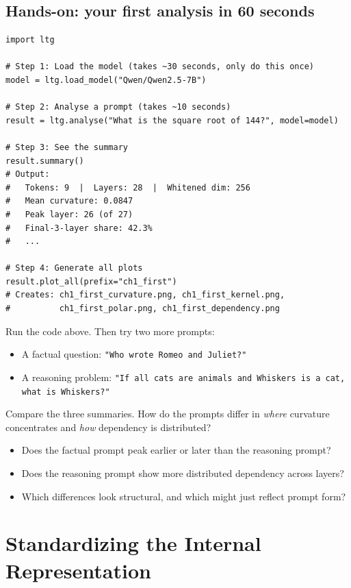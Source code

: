 \documentclass[11pt, twoside, openright]{memoir}
\begin{document}
\section{Hands-on: your first analysis in 60 seconds}

\begin{lstlisting}[caption={Complete first analysis using the ltg library}]
import ltg

# Step 1: Load the model (takes ~30 seconds, only do this once)
model = ltg.load_model("Qwen/Qwen2.5-7B")

# Step 2: Analyse a prompt (takes ~10 seconds)
result = ltg.analyse("What is the square root of 144?", model=model)

# Step 3: See the summary
result.summary()
# Output:
#   Tokens: 9  |  Layers: 28  |  Whitened dim: 256
#   Mean curvature: 0.0847
#   Peak layer: 26 (of 27)
#   Final-3-layer share: 42.3%
#   ...

# Step 4: Generate all plots
result.plot_all(prefix="ch1_first")
# Creates: ch1_first_curvature.png, ch1_first_kernel.png,
#          ch1_first_polar.png, ch1_first_dependency.png
\end{lstlisting}

\begin{tryit}
Run the code above. Then try two more prompts:
\begin{itemize}[nosep]
\item A factual question: \texttt{"Who wrote Romeo and Juliet?"}
\item A reasoning problem: \texttt{"If all cats are animals and Whiskers is a cat, what is Whiskers?"}
\end{itemize}
Compare the three summaries. How do the prompts differ in \emph{where}
curvature concentrates and \emph{how} dependency is distributed?
\begin{itemize}[nosep]
\item Does the factual prompt peak earlier or later than the reasoning prompt?
\item Does the reasoning prompt show more distributed dependency across layers?
\item Which differences look structural, and which might just reflect prompt form?
\end{itemize}
\end{tryit}


\chapter{Standardizing the Internal Representation}
\label{chap:whitening}
\end{document}
